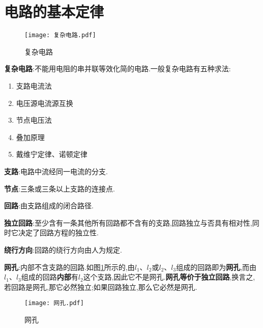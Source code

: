 \section{\K 电路的基本定律}

\begin{wrapfigure}{r}{6cm}
\centering
\texttt{[image: 复杂电路.pdf]}
\caption{复杂电路}
\end{wrapfigure}
\textbf{复杂电路}:不能用电阻的串并联等效化简的电路.一般复杂电路有五种求法:
\begin{enumerate}
    \item 支路电流法
    \item 电压源电流源互换
    \item 节点电压法
    \item 叠加原理
    \item 戴维宁定律、诺顿定律
\end{enumerate}
\textbf{支路}:电路中流经同一电流的分支.

\textbf{节点}:三条或三条以上支路的连接点.

\textbf{回路}:由支路组成的闭合路径.

\textbf{独立回路}:至少含有一条其他所有回路都不含有的支路,回路独立与否具有相对性,同时它决定了回路方程的独立性.

\textbf{绕行方向}:回路的绕行方向由人为规定.

\textbf{网孔}:内部不含支路的回路.如图\ref{fig:网孔}所示的,由$l_1$、$l_2$或$l_2$、$l_3$组成的回路即为\textbf{网孔},而由$l_1$、$l_3$组成的回路\textbf{内部}有$l_2$这个支路,因此它不是网孔.\textbf{网孔等价于独立回路},换言之,若回路是网孔,那它必然独立;如果回路独立,那么它必然是网孔.
\begin{figure}[htbp]
    \centering
    \texttt{[image: 网孔.pdf]}
    \caption{网孔}
    \label{fig:网孔}
\end{figure}

